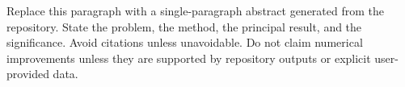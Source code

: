 Replace this paragraph with a single-paragraph abstract generated from the repository. State the problem, the method, the principal result, and the significance. Avoid citations unless unavoidable. Do not claim numerical improvements unless they are supported by repository outputs or explicit user-provided data.
